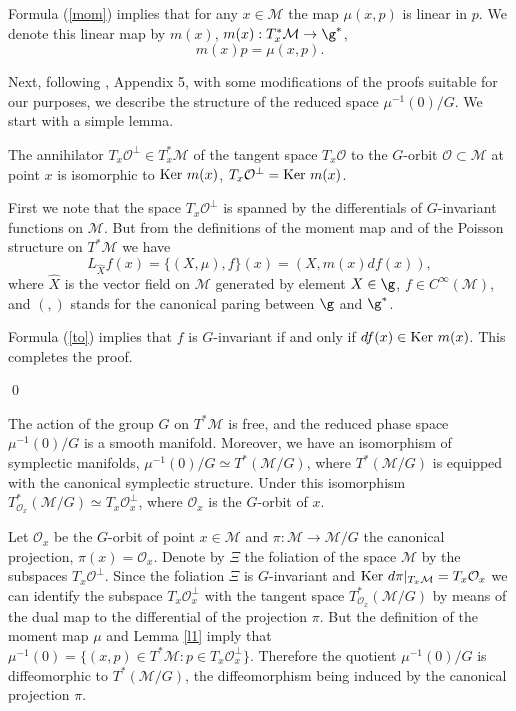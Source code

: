 \documentclass{amsart}
\begin{document}
Formula (\ref{mom}) implies that for
any $x\in \mathcal{M}$ the map $\mu(x,p)$ is linear in $p$. We denote this linear map by $m(x)$,
$m(x):T_x^*\mathcal{M}\rightarrow \g^*$,
\begin{equation}\label{m}
m(x)p=\mu(x,p).
\end{equation}

Next, following \cite{A}, Appendix 5, with some modifications of the proofs suitable for
our purposes, we describe the structure of the reduced space
$\mu^{-1}(0)/{G}$. We start with a simple lemma.
\begin{lemma}\label{l1}
The annihilator $T_x\mathcal{O}^\perp\in T_x^*\mathcal{M}$ of the tangent
space $T_x\mathcal{O}$ to the $G$-orbit $\mathcal{O}\subset \mathcal{M}$ at point $x$ is
isomorphic to ${\rm Ker}~m(x)$, $T_x\mathcal{O}^\perp={\rm Ker}~m(x)$.
\end{lemma}
\pr
First we note that the space $T_x\mathcal{O}^\perp$ is spanned by the
differentials of $G$-invariant functions on $\mathcal{M}$. But from the
definitions of the moment map and of the Poisson structure on
$T^*\mathcal{M}$ we have
\begin{equation}\label{to}
L_{\widehat{X}}f(x)=\{(X,\mu),f\}(x)=(X,m(x)df(x)),
\end{equation}
where $\widehat{X}$ is the vector field on $\mathcal{M}$ generated by
element $X\in \g$, $f\in C^{\infty}(\mathcal{M})$, and $(,)$ stands for the
canonical paring between $\g$ and $\g^*$.

Formula (\ref{to}) implies that $f$ is $G$-invariant if and only if
$df(x)\in {\rm Ker}~m(x)$. This completes the proof.

\qed

\begin{proposition}\label{redstruct}
The action of the group $G$ on $T^*\mathcal{M}$
is free, and the
reduced phase space $\mu^{-1}(0)/{G}$ is a smooth manifold. Moreover, we have
an isomorphism of symplectic manifolds, $\mu^{-1}(0)/{G}\simeq
T^*(\mathcal{M}/{G})$, where $T^*(\mathcal{M}/{G})$ is equipped with the
canonical symplectic structure.
Under this isomorphism
$T_{\mathcal{O}_x}^*(\mathcal{M}/{G})\simeq T_x\mathcal{O}_x^\perp$, where
$\mathcal{O}_x$ is the $G$-orbit of $x$.
\end{proposition}

\pr
Let $\mathcal{O}_x$ be the  $G$-orbit of point $x\in \mathcal{M}$ and
$\pi:\mathcal{M}\rightarrow \mathcal{M}/{G}$ the canonical projection,
$\pi(x)=\mathcal{O}_x$. Denote by $\Xi$ the foliation of the space $\mathcal{M}$ by the
subspaces $T_x\mathcal{O}^\perp$. Since the foliation $\Xi$ is $G$-invariant
and
${\rm Ker}~d\pi|_{T_x\mathcal{M}}=T_x\mathcal{O}_x$ we can identify the
subspace $T_x\mathcal{O}_x^\perp$ with the tangent space
$T_{\mathcal{O}_x}^*(\mathcal{M}/{G})$ by means of the dual map to
the differential of the projection
$\pi$. But the definition of the moment map $\mu$ and Lemma \ref{l1}
imply that
$\mu^{-1}(0)=\{(x,p)\in T^*\mathcal{M}:p \in T_x\mathcal{O}_x^\perp\}$. Therefore
the quotient $\mu^{-1}(0)/{G}$ is diffeomorphic to
$T^*(\mathcal{M}/{G})$, the diffeomorphism being induced by the canonical
projection $\pi$.
\end{document}
